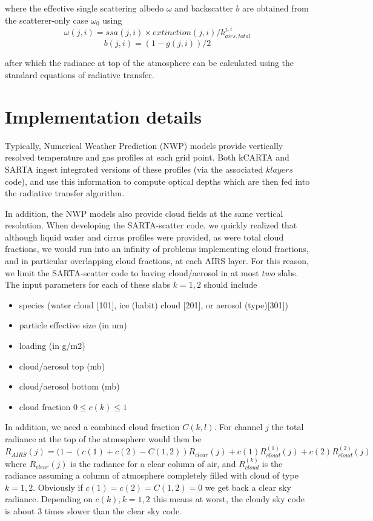 \documentclass[11pt]{article}
\newcommand{\kc}{\textsf{kCARTA}\xspace}
\newcommand{\sa}{\textsf{SARTA}\xspace}
\newcommand{\sasc}{\textsf{SARTA-scatter}\xspace}
\begin{document}
where the effective single scattering albedo $\omega$ and backscatter $b$ are
obtained from the scatterer-only case $\omega_{0}$ using
\[
\omega(j,i) = ssa(j,i) \times extinction(j,i)/k_{airs,total}^{j,i}
\]
\[
b(j,i)      = (1 - g(j,i))/2
\]

after which the radiance at top of the atmosphere can be calculated using the standard equations of radiative transfer.

\section{Implementation details}

Typically, Numerical Weather Prediction (NWP) models provide vertically resolved temperature and gas profiles at each 
grid point. Both \kc and \sa ingest integrated versions of these profiles (via the associated $klayers$ code), and use 
this information to compute optical depths which are then fed into the radiative transfer algorithm.

In addition, the NWP models also provide cloud fields at the same vertical resolution. When developing the \sasc code, we
quickly realized that although liquid water and cirrus profiles were provided, as were total cloud fractions, we would 
run into an infinity of problems implementing cloud fractions, and in particular overlapping cloud fractions, at each 
AIRS layer. For this reason, we limit the \sasc code to having cloud/aerosol in at most $two$ slabs. The input parameters
for each of these slabs $k=1,2$ 
 should include
\begin{itemize}
\item species (water cloud [101], ice (habit) cloud [201], or aerosol (type)[301])
\item particle effective size (in um)
\item loading (in g/m2)
\item cloud/aerosol top (mb)
\item cloud/aerosol bottom (mb)
\item cloud fraction $0 \le c(k) \le 1$
\end{itemize}

In addition, we need a combined cloud fraction $C(k,l)$. For channel $j$ the total radiance at the top of the atmosphere 
would then be
\[
R_{AIRS}(j) = (1 -  (c(1) + c(2) - C(1,2)) R_{clear}(j) + c(1) R^{(1)}_{cloud}(j) + c(2) R^{(2)}_{cloud}(j)
\]
where $R_{clear}(j)$ is the radiance for a clear column of air, and $R^{(k)}_{cloud}$ is the radiance assuming a column 
of atmosphere completely filled with cloud of type $k=1,2$. Obviously if $c(1) = c(2) = C(1,2) = 0$ we get back a clear 
sky radiance. Depending on $c(k),k=1,2$ this means at worst, the cloudy sky code is about 3 times slower than the clear 
sky code.
\end{document}
